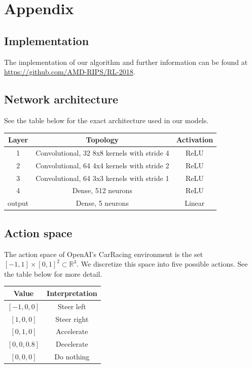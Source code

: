 \documentclass{article}
\begin{document}



\section{Appendix}
\subsection{Implementation}
The implementation of our algorithm and further information can be found at \url{https://github.com/AMD-RIPS/RL-2018}.

\subsection{Network architecture}
See the table below for the exact architecture used in our models. 
\begin{table}[h!]
  \begin{center}
    \begin{tabular}{c|c|c}
      \textbf{Layer} & \textbf{Topology} & \textbf{Activation}\\
      \hline
      1 & Convolutional, 32 8x8 kernels with stride 4 & ReLU \\
      2 & Convolutional, 64 4x4 kernels with stride 2 & ReLU \\
      3 & Convolutional, 64 3x3 kernels with stride 1 & ReLU \\
      4 & Dense, 512 neurons & ReLU \\
      output & Dense, 5 neurons & Linear \\
    \end{tabular}
    \vspace{0.1cm}
    \label{tab:network_architecture}
  \end{center}
\end{table}

\subsection{Action space}
The action space of OpenAI's CarRacing environment is the set $[-1,1]
\times [0,1]^2 \subset \mathbb{R}^3$. We discretize this space into
five possible actions. See the table below for more detail.  
\begin{table}[h!]
  \begin{center}
    \begin{tabular}{c|c}
      \textbf{Value} & \textbf{Interpretation} \\
      \hline
      $[-1,0,0]$ & Steer left \\
      $[1,0,0]$ & Steer right \\
      $[0,1,0]$ & Accelerate \\
      $[0,0,0.8]$ & Decelerate \\
      $[0,0,0]$ & Do nothing \\
    \end{tabular}
    \vspace{0.1cm}
    \label{tab:actions}
  \end{center}
\end{table}
\end{document}
